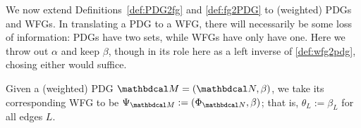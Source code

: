\documentclass{article}
\begin{document}
	We now extend Definitions~\ref{def:PDG2fg} and \ref{def:fg2PDG} to
	(weighted) PDGs and WFGs.  
	In translating a PDG to a WFG, 
	there will necessarily be some loss of information: PDGs have two sets, while WFGs have 
	only have one. Here we throw out $\alpha$ and keep $\beta$, 
	though in its role here as a left inverse of \cref{def:wfg2pdg},
	chosing either would suffice. 
	
	
	\begin{defn}
	Given a (weighted) PDG $\dg M =
	(\dg N, \beta)$, we take its corresponding WFG to be $\WFGof{\dg M} :=
	(\FGof{\dg N}, \beta)$; that is, $\theta_L := \beta_L$ for all edges $L$.
	\end{defn}
	
\end{document}
